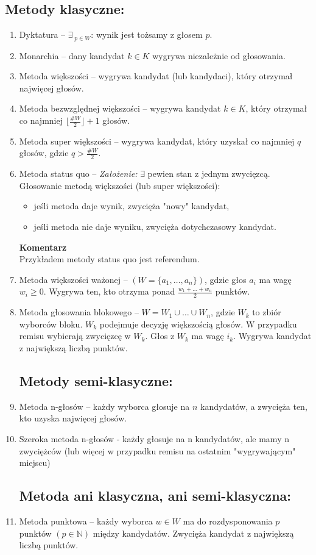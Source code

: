 \documentclass[12pt,a4paper]{article}
\theoremstyle{break}
\newcommand{\Komentarz}[1]{
	\begin{mdframed}[style=zadanie]
		\textbf{Komentarz}\\
		#1
	\end{mdframed}
	}
\begin{document}
\subsection{Metody klasyczne:}
\begin{enumerate}[1)]
	\item Dyktatura – $\exists_{\;p \in W}$: wynik jest tożsamy z głosem $p$.
	\item Monarchia – dany kandydat $k \in K$ wygrywa niezależnie od głosowania.
	\item Metoda większości – wygrywa kandydat (lub kandydaci), który otrzymał najwięcej głosów.
	\item Metoda bezwzględnej większości – wygrywa kandydat $k \in K$, który otrzymał co najmniej $\lfloor\frac{\# W}{2}\rfloor + 1$ głosów.
	\item Metoda super większości – wygrywa kandydat, który uzyskał co najmniej $q$ głosów, gdzie $q > \frac{\# W}{2}$.
	\item Metoda status quo – \textit{Założenie:} $\exists$ pewien stan z jednym zwycięzcą.
	\\ Głosowanie metodą większości (lub super większości):
	\begin{itemize}
		\item jeśli metoda daje wynik, zwycięża "nowy" kandydat,
		\item jeśli metoda nie daje wyniku, zwycięża dotychczasowy kandydat.
	\end{itemize}
	\Komentarz{Przykładem metody status quo jest referendum.}
	\item Metoda większości ważonej – $(W = \{a_1,\dots,a_n\})$, gdzie głos $a_i$ ma wagę $w_i \geq 0$. Wygrywa ten, kto otrzyma ponad $\frac{w_1 + \dots + w_n}{2}$ punktów.
	\item Metoda głosowania blokowego – $W = W_1 \cup \dots \cup W_n$, gdzie $W_k$ to zbiór wyborców bloku. $W_k$ podejmuje decyzję większością głosów. W przypadku remisu wybierają zwycięzcę w $W_k$. Głos z $W_k$ ma wagę $i_k$. Wygrywa kandydat z największą liczbą punktów.
	
	\subsection{Metody semi-klasyczne:}
	\item Metoda n-głosów – każdy wyborca głosuje na $n$ kandydatów, a zwycięża ten, kto uzyska najwięcej głosów.
	\item Szeroka metoda n-głosów - każdy głosuje na n kandydatów, ale mamy n zwyciężców (lub więcej w przypadku remisu na ostatnim "wygrywającym" miejscu)
	
	\subsection{Metoda ani klasyczna, ani semi-klasyczna:}
	\item Metoda punktowa – każdy wyborca $w \in W$ ma do rozdysponowania $p$ punktów $(p \in \mathbb{N})$ między kandydatów. Zwycięża kandydat z największą liczbą punktów.
\end{enumerate}
\end{document}
